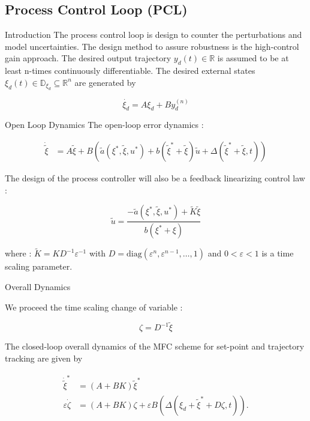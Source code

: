 
\subsection{Process Control Loop (PCL)}
\begin{frame}{Introduction}
    The process control loop is design to counter the perturbations and model uncertainties. The design method to assure robustness is the high-control gain approach. The desired output trajectory \(y_d(t) \in \mathbb{R}\) is assumed to be at least n-times continuously differentiable. The desired external states \(\xi_d(t) \in \mathbb{D}_{\xi_d}  \subseteq \mathbb{R}^n\) are generated by 

\begin{equation}
    \dot{\xi_d} = A\xi_d + By_d^{(n)}
\end{equation}

\end{frame}

\begin{frame}{Open Loop Dynamics}
    The open-loop error dynamics :

\begin{align}
\dot{\tilde{\xi}} &= A\tilde{\xi} + B\left(\tilde{a}(\xi^*, \tilde{\xi}, u^*) + b(\tilde{\xi}^* + \tilde{\xi}) \tilde{u} + \Delta(\tilde{\xi}^* + \tilde{\xi}, t) \right)
\end{align}

The design of the process controller will also be a feedback linearizing control law :

\begin{equation}
\tilde{u} = \frac{-\tilde{a}(\xi^*, \tilde{\xi}, u^*) + \tilde{K}\tilde{\xi}}{b(\xi^* + \xi)}
\end{equation}

where : \(\tilde{K} = KD^{-1}\varepsilon^{-1}\) with \(D = \text{diag}(\varepsilon^{n}, \varepsilon^{n-1}, \ldots, 1)\) and \(0 < \varepsilon < 1\) is a time scaling parameter.

\end{frame}

\begin{frame}{Overall Dynamics}
    
We proceed the time scaling change of variable : 

\begin{equation}
    \zeta = D^{-1}\tilde{\xi}
\end{equation}

The closed-loop overall dynamics of the MFC scheme for set-point and trajectory tracking are given by

\begin{align}
\label{eq:The closed-loop overall dynamics of the MFC}
\dot{\tilde{\xi}}^* &= (A + BK)\tilde{\xi}^* \\
\varepsilon\dot{\zeta} &= (A + BK)\zeta + \varepsilon B \left(\Delta(\xi_d + \tilde{\xi}^* + D\zeta, t) \right).
\end{align}

\end{frame}

